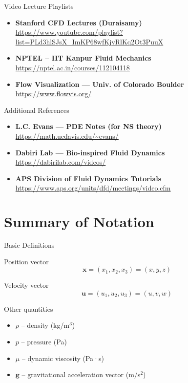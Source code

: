 \documentclass[aspectratio=169]{beamer}
\begin{document}
\begin{frame}{Video Lecture Playlists}

\begin{itemize}
  \item \textbf{Stanford CFD Lectures (Duraisamy)}  
  \url{https://www.youtube.com/playlist?list=PLd3hlSJsX_ImKP68wfKjvRlKq2Ot3PuuX}

  \item \textbf{NPTEL – IIT Kanpur Fluid Mechanics}  
  \url{https://nptel.ac.in/courses/112104118}

  \item \textbf{Flow Visualization — Univ. of Colorado Boulder}  
  \url{https://www.flowvis.org/}

\end{itemize}

\end{frame}

\begin{frame}{Additional References}

\begin{itemize}
  \item \textbf{L.C. Evans — PDE Notes (for NS theory)}  
  \url{https://math.ucdavis.edu/~evans/}

  \item \textbf{Dabiri Lab — Bio-inspired Fluid Dynamics}  
  \url{https://dabirilab.com/videos/}

  \item \textbf{APS Division of Fluid Dynamics Tutorials}  
  \url{https://www.aps.org/units/dfd/meetings/video.cfm}
\end{itemize}

\end{frame}


\section{Summary of Notation}
\footnotesize
\begin{frame}{Basic Definitions}
\begin{block}{Position vector}
\[
\mathbf{x} = (x_1, x_2, x_3) = (x, y, z)
\]
\end{block}
\begin{block}{Velocity vector}
\[
\mathbf{u} = (u_1, u_2, u_3) = (u, v, w)
\]
\end{block}
\begin{block}{Other quantities}
\begin{itemize}
  \item $\rho$ – density (kg/m$^3$)
  \item $p$ – pressure (Pa)
  \item $\mu$ – dynamic viscosity (Pa·s)
  \item $\mathbf{g}$ – gravitational acceleration vector (m/s$^2$)
\end{itemize}
\end{block}
\end{frame}
\end{document}

